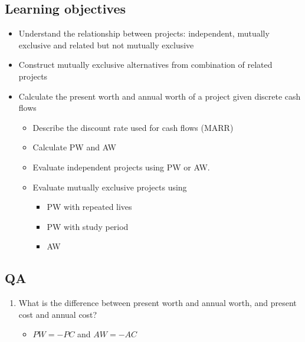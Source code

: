 \subsection{Learning objectives}
\begin{definition}
    \begin{itemize}
        \item Understand the relationship between projects: independent, mutually exclusive and related but not mutually exclusive
        \item Construct mutually exclusive alternatives from combination of related projects
        \item Calculate the present worth and annual worth of a project given discrete cash flows
        \begin{itemize}
            \item Describe the discount rate used for cash flows (MARR)
            \item Calculate PW and AW
            \item Evaluate independent projects using PW or AW.
            \item Evaluate mutually exclusive projects using 
            \begin{itemize}
                \item PW with repeated lives
                \item PW with study period
                \item AW
            \end{itemize}
        \end{itemize}
    \end{itemize}
\end{definition}

\subsection{QA}
\begin{definition}
    \begin{enumerate}
        \item What is the difference between present worth and annual worth, and present cost and annual cost? 
        \begin{itemize}
            \item $PW=-PC$ and $AW=-AC$
        \end{itemize}
    \end{enumerate}
\end{definition}

